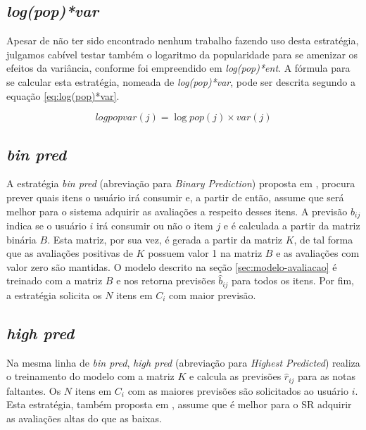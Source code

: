 \subsection{\textit{log(pop)*var}}
Apesar de não ter sido encontrado nenhum trabalho fazendo uso desta estratégia, julgamos cabível testar também o logaritmo da popularidade para se amenizar os efeitos da variância, conforme foi empreendido em \textit{log(pop)*ent}. A fórmula para se calcular esta estratégia, nomeada de \textit{log(pop)*var}, pode ser descrita segundo a equação \ref{eq:log(pop)*var}.

\begin{equation}
logpopvar(j) = \log pop(j) \times var(j)
\label{eq:log(pop)*var}
\end{equation}

\subsection{\textit{bin pred}}
A estratégia \textit{bin pred} (abreviação para \textit{Binary Prediction}) proposta em \citep{Elahi:2014:ALS:2542182.2542195}, procura prever quais itens o usuário irá consumir e, a partir de então, assume que será melhor para o sistema adquirir as avaliações a respeito desses itens. A previsão $\hat{b}_{ij}$ indica se o usuário $i$ irá consumir ou não o item $j$ e é calculada a partir da matriz binária $B$. Esta matriz, por sua vez, é gerada a partir da matriz $K$, de tal forma que as avaliações positivas de $K$ possuem valor 1 na matriz $B$ e as avaliações com valor zero são mantidas. O modelo descrito na seção \ref{sec:modelo-avaliacao} é treinado com a matriz $B$ e nos retorna previsões $\hat{b}_{ij}$ para todos os itens. Por fim, a estratégia solicita os $N$ itens em $C_i$ com maior previsão.

\subsection{\textit{high pred}}
Na mesma linha de \textit{bin pred}, \textit{high pred} (abreviação para \textit{Highest Predicted}) realiza o treinamento do modelo com a matriz $K$ e calcula as previsões $\hat{r}_{ij}$ para as notas faltantes. Os $N$ itens em $C_i$ com as maiores previsões são solicitados ao usuário $i$. Esta estratégia, também proposta em \citep{Elahi:2014:ALS:2542182.2542195}, assume que é melhor para o SR adquirir as avaliações altas do que as baixas.

